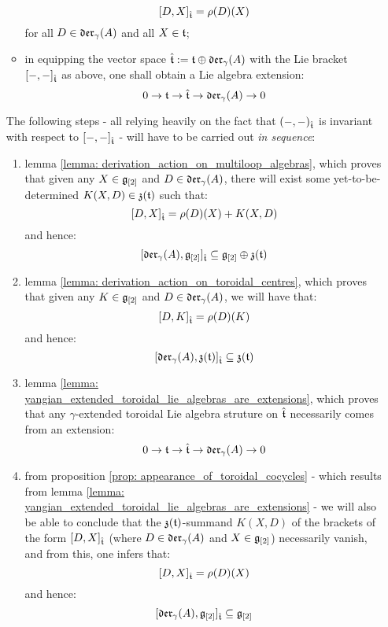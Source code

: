 \begin{itemize}
\begin{itemize}
                    $$[D, X]_{\hat{\mathfrak{t}}} = \rho(D)(X)$$
                for all $D \in \mathfrak{der}_{\gamma}(A)$ and all $X \in \mathfrak{t}$;
                \item in equipping the vector space $\hat{\mathfrak{t}} := \mathfrak{t} \oplus \mathfrak{der}_{\gamma}(A)$ with the Lie bracket $[-, -]_{\hat{\mathfrak{t}}}$ as above, one shall obtain a Lie algebra extension:
                    $$0 \to \mathfrak{t} \to \hat{\mathfrak{t}} \to \mathfrak{der}_{\gamma}(A) \to 0$$
            \end{itemize}
            The following steps - all relying heavily on the fact that $(-, -)_{\hat{\mathfrak{t}}}$ is invariant with respect to $[-, -]_{\hat{\mathfrak{t}}}$ - will have to be carried out \textit{in sequence}:
            \begin{enumerate}
                \item lemma \ref{lemma: derivation_action_on_multiloop_algebras}, which proves that given any $X \in \mathfrak{g}_{[2]}$ and $D \in \mathfrak{der}_{\gamma}(A)$, there will exist some yet-to-be-determined $K(X, D) \in \mathfrak{z}(\mathfrak{t})$ such that:
                    $$[D, X]_{\hat{\mathfrak{t}}} = \rho(D)(X) + K(X, D)$$
                and hence:
                    $$[\mathfrak{der}_{\gamma}(A), \mathfrak{g}_{[2]}]_{\hat{\mathfrak{t}}} \subseteq \mathfrak{g}_{[2]} \oplus \mathfrak{z}(\mathfrak{t})$$
                \item lemma \ref{lemma: derivation_action_on_toroidal_centres}, which proves that given any $K \in \mathfrak{g}_{[2]}$ and $D \in \mathfrak{der}_{\gamma}(A)$, we will have that:
                    $$[D, K]_{\hat{\mathfrak{t}}} = \rho(D)(K)$$
                and hence:
                    $$[\mathfrak{der}_{\gamma}(A), \mathfrak{z}(\mathfrak{t})]_{\hat{\mathfrak{t}}} \subseteq \mathfrak{z}(\mathfrak{t})$$
                \item lemma \ref{lemma: yangian_extended_toroidal_lie_algebras_are_extensions}, which proves that any $\gamma$-extended toroidal Lie algebra struture on $\hat{\mathfrak{t}}$ necessarily comes from an extension:
                    $$0 \to \mathfrak{t} \to \hat{\mathfrak{t}} \to \mathfrak{der}_{\gamma}(A) \to 0$$
                \item from proposition \ref{prop: appearance_of_toroidal_cocycles} - which results from lemma \ref{lemma: yangian_extended_toroidal_lie_algebras_are_extensions} - we will also be able to conclude that the $\mathfrak{z}(\mathfrak{t})$-summand $K(X, D)$ of the brackets of the form $[D, X]_{\hat{\mathfrak{t}}}$ (where $D \in \mathfrak{der}_{\gamma}(A)$ and $X \in \mathfrak{g}_{[2]}$) necessarily vanish, and from this, one infers that:
                    $$[D, X]_{\hat{\mathfrak{t}}} = \rho(D)(X)$$
                and hence:
                    $$[\mathfrak{der}_{\gamma}(A), \mathfrak{g}_{[2]}]_{\hat{\mathfrak{t}}} \subseteq \mathfrak{g}_{[2]}$$

\end{enumerate}
\end{itemize}
